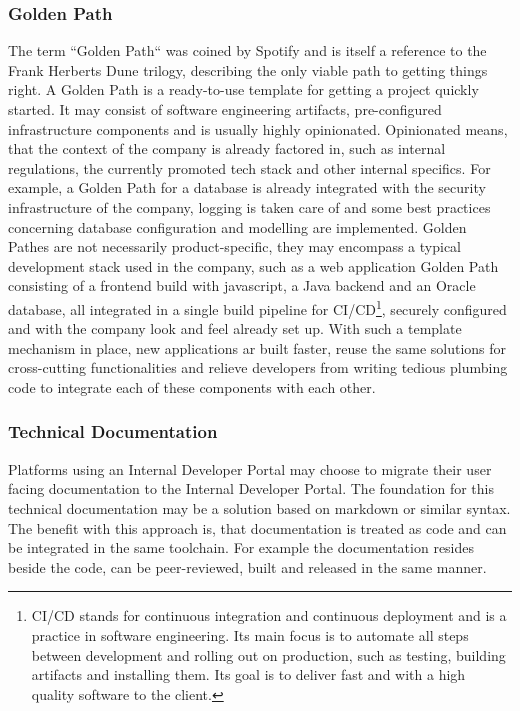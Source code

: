 \documentclass[a4paper,12pt]{article}
\begin{document}
    \subsubsection{Golden Path}
    The term ``Golden Path`` was coined by Spotify\parencite{spotifygoldenpath} and is itself a reference to the Frank
    Herberts Dune trilogy, describing the only viable path to getting things right.
    A Golden Path is a ready-to-use template for getting a project quickly started.
    It may consist of software engineering artifacts, pre-configured infrastructure components and is usually highly
    opinionated.
    Opinionated means, that the context of the company is already factored in, such as internal regulations,
    the currently promoted tech stack and other internal specifics.
    For example, a Golden Path for a database is already integrated with the security infrastructure of the company,
    logging is taken care of and some best practices concerning database configuration and modelling are implemented.
    Golden Pathes are not necessarily product-specific, they may encompass a typical development stack used
    in the company, such as a web application Golden Path consisting of a frontend build with javascript, a Java backend
    and an Oracle database, all integrated in a single build pipeline for CI/CD\footnote{CI/CD stands for continuous
    integration and continuous deployment and is a practice in software engineering. Its main focus is to automate all steps
    between development and rolling out on production, such as testing, building artifacts and installing them. Its goal
    is to deliver fast and with a high quality software to the client.}, securely configured and with the
    company look and feel already set up.
    With such a template mechanism in place, new applications ar built faster, reuse the same solutions for cross-cutting
    functionalities and relieve developers from writing tedious plumbing code to integrate each of these components with
    each other.

    \subsubsection{Technical Documentation}
    Platforms using an Internal Developer Portal may choose to migrate their user facing documentation to the Internal
    Developer Portal.
    The foundation for this technical documentation may be a solution based on markdown\parencite{backstagetechdocs}
    or similar syntax.
    The benefit with this approach is, that documentation is treated as code and can be integrated in the same toolchain.
    For example the documentation resides beside the code, can be peer-reviewed, built and released in the same manner.
\end{document}
